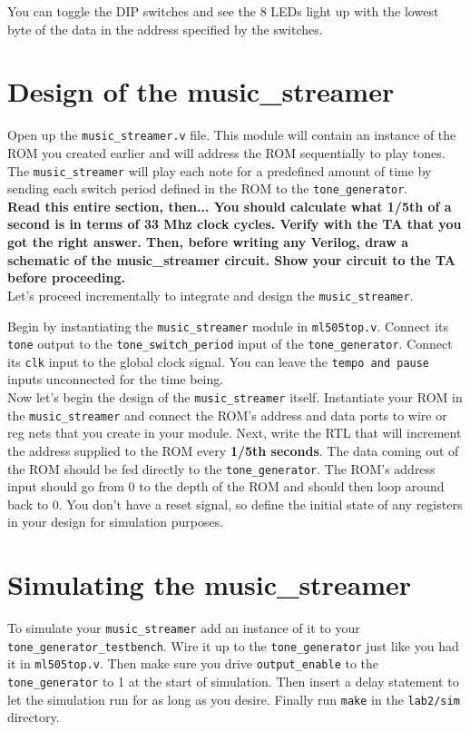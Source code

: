 \documentclass[11pt]{article}
\begin{document}
You can toggle the DIP switches and see the 8 LEDs light up with the lowest byte of the data in the address specified by the switches.
\section{Design of the music\_streamer}
Open up the \verb|music_streamer.v| file. This module will contain an instance of the ROM you created earlier and will address the ROM sequentially to play tones. The \verb|music_streamer| will play each note for a predefined amount of time by sending each switch period defined in the ROM to the \verb|tone_generator|.\\

\textbf{Read this entire section, then... You should calculate what 1/5th of a second is in terms of 33 Mhz clock cycles. Verify with the TA that you got the right answer. Then, before writing any Verilog, draw a schematic of the music\_streamer circuit. Show your circuit to the TA before proceeding.}\\

Let's proceed incrementally to integrate and design the \verb|music_streamer|.

Begin by instantiating the \verb|music_streamer| module in \verb|ml505top.v|. Connect its \verb|tone| output to the \verb|tone_switch_period| input of the \verb|tone_generator|. Connect its \verb|clk| input to the global clock signal. You can leave the \verb|tempo and pause| inputs unconnected for the time being.\\

Now let's begin the design of the \verb|music_streamer| itself. Instantiate your ROM in the \verb|music_streamer| and connect the ROM's address and data ports to wire or reg nets that you create in your module. Next, write the RTL that will increment the address supplied to the ROM every \textbf{1/5th seconds}. The data coming out of the ROM should be fed directly to the \verb|tone_generator|. The ROM's address input should go from 0 to the depth of the ROM and should then loop around back to 0. You don't have a reset signal, so define the initial state of any registers in your design for simulation purposes.

\section{Simulating the music\_streamer}
To simulate your \verb|music_streamer| add an instance of it to your \verb|tone_generator_testbench|. Wire it up to the \verb|tone_generator| just like you had it in \verb|ml505top.v|. Then make sure you drive \verb|output_enable| to the \verb|tone_generator| to 1 at the start of simulation. Then insert a delay statement to let the simulation run for as long as you desire. Finally run \verb|make| in the \verb|lab2/sim| directory.\\
\end{document}
